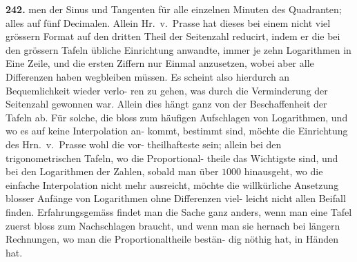 \documentclass[12pt,a4paper]{article}
\begin{document}
\newpage
\noindent\textbf{242.}\quad
men der Sinus und Tangenten für alle einzelnen Minuten des Quadranten; alles
auf fünf Decimalen. Allein Hr.~v.~Prasse hat dieses bei einem nicht viel grössern
Format auf den dritten Theil der Seitenzahl reducirt, indem er die bei den grössern
Tafeln übliche Einrichtung anwandte, immer je zehn Logarithmen in Eine Zeile,
und die ersten Ziffern nur Einmal anzusetzen, wobei aber alle Differenzen haben
wegbleiben müssen. Es scheint also hierdurch an Bequemlichkeit wieder verlo-
ren zu gehen, was durch die Verminderung der Seitenzahl gewonnen war. Allein
dies hängt ganz von der Beschaffenheit der Tafeln ab. Für solche, die bloss zum
häufigen Aufschlagen von Logarithmen, und wo es auf keine Interpolation an-
kommt, bestimmt sind, möchte die Einrichtung des Hrn.~v.~Prasse wohl die vor-
theilhafteste sein; allein bei den trigonometrischen Tafeln, wo die Proportional-
theile das Wichtigste sind, und bei den Logarithmen der Zahlen, sobald man über
$1000$ hinausgeht, wo die einfache Interpolation nicht mehr ausreicht, möchte die
willkürliche Ansetzung blosser Anfänge von Logarithmen ohne Differenzen viel-
leicht nicht allen Beifall finden. Erfahrungsgemäss findet man die Sache ganz
anders, wenn man eine Tafel zuerst bloss zum Nachschlagen braucht, und wenn
man sie hernach bei längern Rechnungen, wo man die Proportionaltheile bestän-
dig nöthig hat, in Händen hat.
\end{document}
